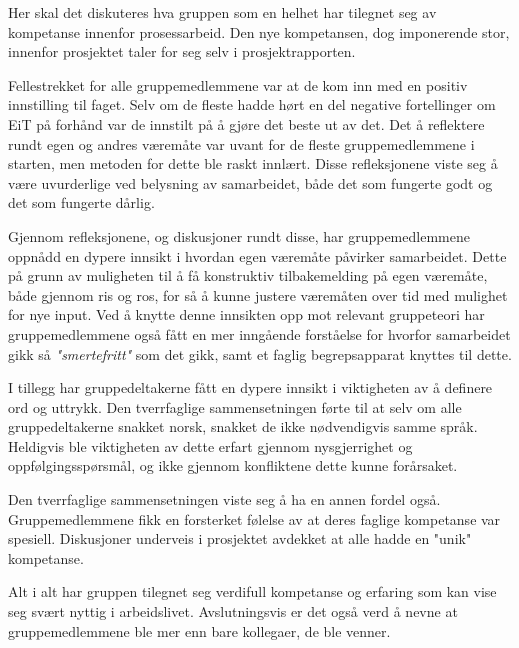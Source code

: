 Her skal det diskuteres hva gruppen som en helhet har tilegnet seg av kompetanse innenfor prosessarbeid.
Den nye kompetansen, dog imponerende stor, innenfor prosjektet taler for seg selv i prosjektrapporten.
 
Fellestrekket for alle gruppemedlemmene var at de kom inn med en positiv innstilling til faget.
Selv om de fleste hadde hørt en del negative fortellinger om EiT på forhånd var de innstilt på å gjøre det beste ut av det.
Det å reflektere rundt egen og andres væremåte var uvant for de fleste gruppemedlemmene i starten, men metoden for dette ble raskt innlært.
Disse refleksjonene viste seg å være uvurderlige ved belysning av samarbeidet, både det som fungerte godt og det som fungerte dårlig.

Gjennom refleksjonene, og diskusjoner rundt disse, har gruppemedlemmene oppnådd en dypere innsikt i hvordan egen væremåte påvirker samarbeidet.
Dette på grunn av muligheten til å få konstruktiv tilbakemelding på egen væremåte, både gjennom ris og ros, for så å kunne justere væremåten over tid med mulighet for nye input.
Ved å knytte denne innsikten opp mot relevant gruppeteori har gruppemedlemmene også fått en mer inngående forståelse for hvorfor samarbeidet gikk så \emph{"smertefritt"} som det gikk, samt et faglig begrepsapparat knyttes til dette.

I tillegg har gruppedeltakerne fått en dypere innsikt i viktigheten av å definere ord og uttrykk.
Den tverrfaglige sammensetningen førte til at selv om alle gruppedeltakerne snakket norsk, snakket de ikke nødvendigvis samme språk.
Heldigvis ble viktigheten av dette erfart gjennom nysgjerrighet og oppfølgingsspørsmål, og ikke gjennom konfliktene dette kunne forårsaket.

Den tverrfaglige sammensetningen viste seg å ha en annen fordel også.
Gruppemedlemmene fikk en forsterket følelse av at deres faglige kompetanse var spesiell.
Diskusjoner underveis i prosjektet avdekket at alle hadde en "unik" kompetanse.
  
Alt i alt har gruppen tilegnet seg verdifull kompetanse og erfaring som kan vise seg svært nyttig i arbeidslivet.
Avslutningsvis er det også verd å nevne at gruppemedlemmene ble mer enn bare kollegaer, de ble venner.
